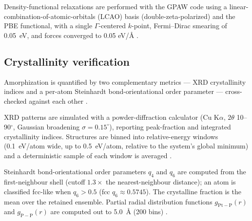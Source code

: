 Density-functional relaxations are performed with the GPAW code
\cite{gpaw2010,ase2017} using a linear-combination-of-atomic-orbitals (LCAO)
basis (double-zeta-polarized) and the PBE functional, with a single
$\Gamma$-centered $k$-point, Fermi--Dirac smearing of 0.05~eV, and forces
converged to 0.05 eV/\AA{} \cite{madanchi2024}.

\subsection{Crystallinity verification}\label{sec:methods-crystallinity}

Amorphization is quantified by two complementary metrics --- XRD
crystallinity indices and a per-atom Steinhardt bond-orientational order
parameter --- cross-checked against each other \cite{steinhardt1983}.

XRD patterns are simulated with a powder-diffraction calculator (Cu K$\alpha$,
$2\theta$ 10--90$^{\circ}$, Gaussian broadening $\sigma = 0.15^{\circ}$),
reporting peak-fraction and integrated crystallinity indices. Structures are
binned into relative-energy windows (0.1~eV/atom wide, up to 0.5~eV/atom,
relative to the system's global minimum) and a deterministic sample of each
window is averaged \cite{pymatgen2013,ase2017}.

Steinhardt bond-orientational order parameters $q_4$ and $q_6$ are computed
from the first-neighbour shell (cutoff $1.3\times$ the nearest-neighbour
distance); an atom is classified fcc-like when $q_6 > 0.5$ (fcc $q_6 \approx
0.5745$). The crystalline fraction is the mean over the retained ensemble.
Partial radial distribution functions $g_{\mathrm{Pt-P}}(r)$
and $g_{\mathrm{P-P}}(r)$ are computed out to 5.0~\AA{} (200 bins)
\cite{ase2017}.
